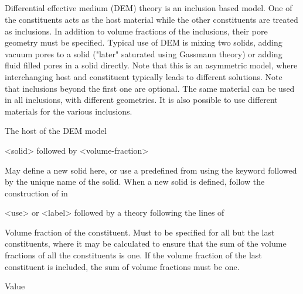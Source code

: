 {\subparagraph{}
 \slist
   \item \Description Differential effective medium (DEM) theory is an inclusion based model. One of the constituents acts as the host material while the other constituents are treated as inclusions. In addition to volume fractions of the inclusions, their pore geometry must be specified. Typical use of DEM is mixing two solids, adding vacuum pores to a solid ("later" saturated using Gassmann theory) or adding fluid filled pores in a solid directly. Note that this is an asymmetric model, where interchanging host and constituent typically leads to different solutions. Note that inclusions beyond the first one are optional. The same material can be used in all inclusions, with different geometries. It is also possible to use different materials for the various inclusions.
   \item \Argument
   \item \Default 
 \elist

 \slist
   \item \Description The host of the DEM model
   \item \Argument <solid> followed by <volume-fraction>
   \item \Default
 \elist

 \slist
   \item \Description May define a new solid here, or use a predefined  from  using the keyword  followed by the unique name of the solid. When a new solid is defined, follow the construction of  in 
   \item \Argument <use> or <label> followed by a theory following the lines of 
   \item \Default
 \elist

 \slist
   \item \Description Volume fraction of the constituent. Must to be specified for all but the last constituents, where it may be calculated to ensure that the sum of the volume fractions of all the constituents is one. If the volume fraction of the last constituent is included, the sum of volume fractions must be one. 
   \item \Argument Value
   \item \Default
 \elist

}
